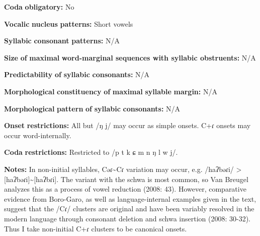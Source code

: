 \documentclass[output=paper]{langsci/langscibook}
\begin{document}
\begin{styleBody}
\textbf{Coda} \textbf{obligatory:} No
\end{styleBody}

\begin{styleBody}
\textbf{Vocalic} \textbf{nucleus} \textbf{patterns:} Short vowels
\end{styleBody}

\begin{styleBody}
\textbf{Syllabic} \textbf{consonant} \textbf{patterns:} N/A
\end{styleBody}

\begin{styleBody}
\textbf{Size} \textbf{of} \textbf{maximal} \textbf{word{}-marginal sequences with syllabic obstruents:} N/A
\end{styleBody}

\begin{styleBody}
\textbf{Predictability} \textbf{of} \textbf{syllabic} \textbf{consonants:} N/A
\end{styleBody}

\begin{styleBody}
\textbf{Morphological} \textbf{constituency} \textbf{of} \textbf{maximal} \textbf{syllable} \textbf{margin:} N/A
\end{styleBody}

\begin{styleBody}
\textbf{Morphological} \textbf{pattern} \textbf{of} \textbf{syllabic} \textbf{consonants:} N/A
\end{styleBody}

\begin{styleBody}
\textbf{Onset} \textbf{restrictions:} All but /ŋ j/ may occur as simple onsets. C+ɾ onsets may occur word-internally.
\end{styleBody}

\begin{styleBody}
\textbf{Coda} \textbf{restrictions:} Restricted to /p t k ɕ m n ŋ l w j/. 
\end{styleBody}

\begin{styleBody}
\textbf{Notes:} In non-initial syllables, Cəɾ{\textasciitilde}Cɾ variation may occur, e.g. /haʔbəɾi/ > [haʔbəɾi]{\textasciitilde}[haʔbɾi]. The variant with the schwa is most common, so Van Breugel analyzes this as a process of vowel reduction (2008: 43). However, comparative evidence from Boro-Garo, as well as language-internal examples given in the text, suggest that the /Cɾ/ clusters are original and have been variably resolved in the modern language through consonant deletion and schwa insertion (2008: 30-32). Thus I take non-initial C+ɾ clusters to be canonical onsets.
\end{styleBody}
\end{document}
